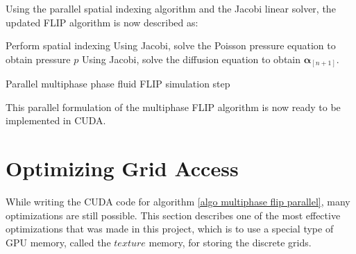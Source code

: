 Using the parallel spatial indexing algorithm and the Jacobi linear solver, the updated FLIP algorithm is now described as:


\gapM

\begin{algorithm}[H]
    \label{algo multiphase flip parallel}

    \SetAlgoLined
    Perform spatial indexing\;
    Using Jacobi, solve the Poisson pressure equation to obtain pressure $p$\;
    Using Jacobi, solve the diffusion equation to obtain $\bm{\alpha}_{[n+1]}$.

    \caption{Parallel multiphase phase fluid FLIP simulation step}

\end{algorithm}

\gapM

This parallel formulation of the multiphase FLIP algorithm is now ready to be implemented in CUDA.

\section{Optimizing Grid Access}
While writing the CUDA code for algorithm \ref{algo multiphase flip parallel}, many optimizations are still possible. This section describes one of the most effective optimizations that was made in this project, which is to use a special type of GPU memory, called the $texture$ memory, for storing the discrete grids.

